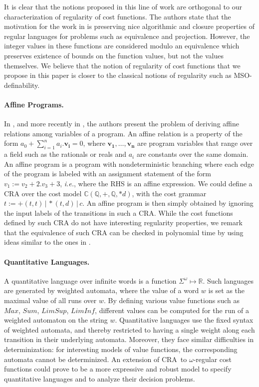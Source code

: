 \documentclass[11pt]{article}
\newcommand{\Rat}{\ensuremath{\mathbb{Q}}}
\newcommand{\sep}{\ensuremath{\,|\,}}
\newcommand{\CostModel}{\ensuremath{\mathbb{C}}}
\newcommand{\EDWA}{{CRA}\xspace}
\newcommand{\ie}{{\em i.e.}\xspace}
\begin{document}
It is clear that the notions proposed in this line of work are
orthogonal to our characterization of regularity of cost functions.
The authors state that the motivation for the work in
\cite{colcombet_theory_2009,colcombet_regular_2010} is preserving nice
algorithmic and closure properties of regular languages for problems
such as equivalence and projection. However, the integer values in
these functions are considered modulo an equivalence which preserves
existence of bounds on the function values, but not the values
themselves. We believe that the notion of regularity of cost functions
that we propose in this paper is closer to the classical notions of
regularity such as MSO-definability.

\paragraph{Affine Programs.} In \cite{karr_affine_1976}, and more
recently in \cite{olm_note_2004, olm_precise_2004}, the authors
present the problem of deriving affine relations among variables of a
program.  An affine relation is a property of the form $a_0 +
\sum^{n}_{i=1} a_i.\mathbf{v_i} = 0$, where
$\mathbf{v_1},\ldots,\mathbf{v_n}$ are program variables that range
over a field such as the rationals or reals and  $a_i$ are constants
over the same domain. An affine program is a program with
nondeterministic branching where each edge of the program is labeled
with an assignment statement of the form $v_1 := v_2 + 2.v_3 + 3$,
\ie, where the RHS is an affine expression. We could define a \EDWA
over the cost model $\CostModel(\Rat, +, \Rat, *d)$, with the cost
grammar $t:= +(t,t) \sep *(t,d) \sep c$. An affine program is then
simply obtained by ignoring the input labels of the transitions in
such a \EDWA.  While the cost functions defined by such \EDWA do not
have interesting regularity properties, we remark that the equivalence
of such \EDWA can be checked in polynomial time by using ideas similar
to the ones in \cite{olm_note_2004}.

\paragraph{Quantitative Languages.} A quantitative language
\cite{CDH10,almagor_what_2011,AKL10} over infinite words is a function
$\Sigma^\omega \mapsto \mathbb{R}$. Such languages are generated by
weighted automata, where the value of a word $w$ is set as the maximal
value of all runs over $w$. By defining various value functions such
as $\mathit{Max}$, $\mathit{Sum}$, $\mathit{LimSup}$,
$\mathit{LimInf}$, different values can be computed for the run of a
weighted automaton on the string $w$.  Quantitative languages use the
fixed syntax of weighted automata, and thereby restricted to having a
single weight along each transition in their underlying automata.
Moreover, they face similar difficulties in determinization: for
interesting models of value functions, the corresponding automata
cannot be determinized.  An extension of \EDWA\ to $\omega$-regular
cost functions could prove to be a more expressive and robust model to
specify quantitative languages and to analyze their decision problems.
\end{document}
